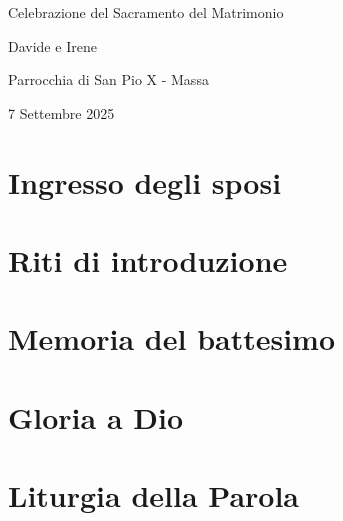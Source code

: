 \documentclass[12pt, a4paper]{article}
\begin{document}
\begin{center}
{\brittany\Huge Celebrazione del Sacramento del Matrimonio}

\vspace{1cm}

{\brittany\LARGE Davide e Irene}

\vspace{0.5cm}


\vspace{0.5cm}

{\brittany\Large Parrocchia di San Pio X - Massa}

\vspace{0.5cm}

{\brittany\Large 7 Settembre 2025}
\end{center}

\thispagestyle{empty}

\newpage

\section*{Ingresso degli sposi}


\section*{Riti di introduzione}


\section*{Memoria del battesimo}


\section*{Gloria a Dio}


\section*{Liturgia della Parola}

\end{document}

